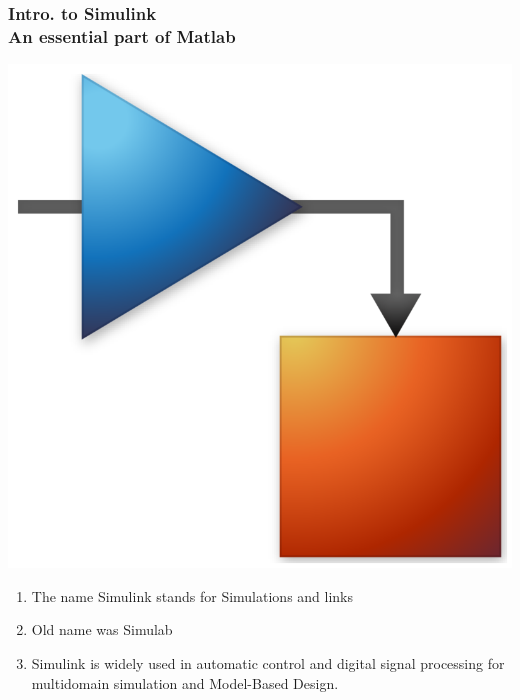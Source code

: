 \documentclass[hyperref={pdfpagelabels=true}]{beamer}
\begin{document}
\begin{frame}
\frametitle{Intro. to Simulink \\ {\large An essential part of Matlab}}

\begin{flushright}
\includegraphics[scale = 0.05]{figs/Selection_036.png}
\end{flushright}
\begin{enumerate}
\item The name Simulink stands for Simulations and links
\item Old name was Simulab 
\item Simulink is widely used in automatic control and digital signal processing for multidomain simulation and Model-Based Design.
\end{enumerate}

\end{frame}
\end{document}
